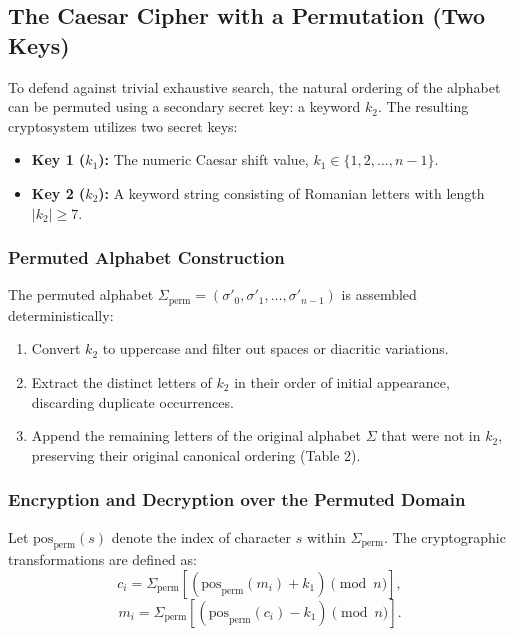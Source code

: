 \documentclass{labreport}
\begin{document}
\subsection{The Caesar Cipher with a Permutation (Two Keys)}

To defend against trivial exhaustive search, the natural ordering of the alphabet can be permuted using a secondary secret key: a keyword $k_2$. The resulting cryptosystem utilizes two secret keys:
\begin{itemize}[noitemsep, topsep=2pt]
    \item \textbf{Key 1 ($k_1$):} The numeric Caesar shift value, $k_1 \in \{1, 2, \dots, n-1\}$.
    \item \textbf{Key 2 ($k_2$):} A keyword string consisting of Romanian letters with length $|k_2| \ge 7$.
\end{itemize}

\subsubsection{Permuted Alphabet Construction}
The permuted alphabet $\Sigma_{\text{perm}} = (\sigma'_0, \sigma'_1, \dots, \sigma'_{n-1})$ is assembled deterministically:
\begin{enumerate}[leftmargin=*]
    \item Convert $k_2$ to uppercase and filter out spaces or diacritic variations.
    \item Extract the distinct letters of $k_2$ in their order of initial appearance, discarding duplicate occurrences.
    \item Append the remaining letters of the original alphabet $\Sigma$ that were not in $k_2$, preserving their original canonical ordering (Table 2).
\end{enumerate}

\subsubsection{Encryption and Decryption over the Permuted Domain}
Let $\text{pos}_{\text{perm}}(s)$ denote the index of character $s$ within $\Sigma_{\text{perm}}$. The cryptographic transformations are defined as:
\begin{equation}
    c_i = \Sigma_{\text{perm}}\left[ (\text{pos}_{\text{perm}}(m_i) + k_1) \pmod n \right],
\end{equation}
\begin{equation}
    m_i = \Sigma_{\text{perm}}\left[ (\text{pos}_{\text{perm}}(c_i) - k_1) \pmod n \right].
\end{equation}
\end{document}
